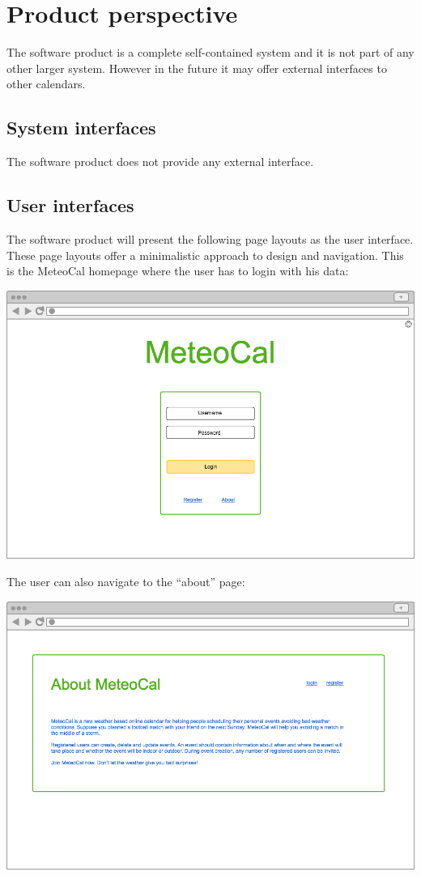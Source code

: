 \documentclass[10pt,a4paper,titlepage]{article}
\begin{document}
\section{Product perspective}
The software product is a complete self-contained system and it is not part of any other larger system. However in the future it may offer external interfaces to other calendars.

\subsection{System interfaces}
The software product does not provide any external interface.

\subsection{User interfaces}
The software product will present the following page layouts as the user interface. These
page layouts offer a minimalistic approach to design and navigation.
This is the MeteoCal homepage where the user has to login with his data:

\vspace{2mm}\includegraphics[width={\linewidth}]{./UI_mockups/01-login.png}\vspace{3mm}

The user can also navigate to the “about” page:

\vspace{3mm}\includegraphics[width={\linewidth}]{./UI_mockups/02-about.png}\vspace{3mm}
\end{document}
